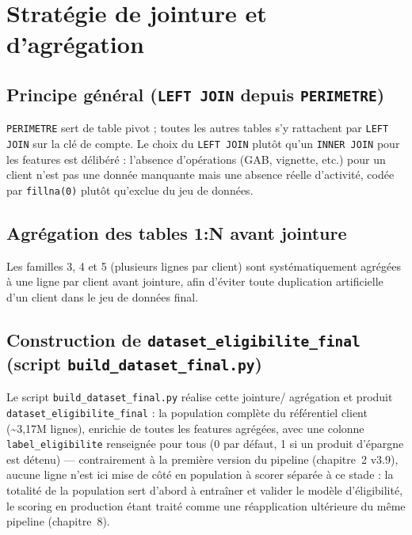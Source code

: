 \documentclass[11pt,a4paper]{report}
\begin{document}

\section{Stratégie de jointure et d'agrégation}

\subsection{Principe général (\texttt{LEFT JOIN} depuis \texttt{PERIMETRE})}
\texttt{PERIMETRE} sert de table pivot ; toutes les autres tables s'y
rattachent par \texttt{LEFT JOIN} sur la clé de compte. Le choix du
\texttt{LEFT JOIN} plutôt qu'un \texttt{INNER JOIN} pour les features est
délibéré : l'absence d'opérations (GAB, vignette, etc.) pour un client
n'est pas une donnée manquante mais une absence réelle d'activité, codée
par \texttt{fillna(0)} plutôt qu'exclue du jeu de données.

\subsection{Agrégation des tables 1:N avant jointure}
Les familles 3, 4 et 5 (plusieurs lignes par client) sont systématiquement
agrégées à une ligne par client avant jointure, afin d'éviter toute
duplication artificielle d'un client dans le jeu de données final.

\subsection{Construction de \texttt{dataset\_eligibilite\_final} (script \texttt{build\_dataset\_final.py})}
Le script \texttt{build\_dataset\_final.py} réalise cette jointure/
agrégation et produit \texttt{dataset\_eligibilite\_final} : la population
complète du référentiel client (\textasciitilde 3,17M lignes), enrichie de
toutes les features agrégées, avec une colonne \texttt{label\_eligibilite}
renseignée pour tous (0 par défaut, 1 si un produit d'épargne est détenu)
— contrairement à la première version du pipeline (chapitre~2 v3.9),
aucune ligne n'est ici mise de côté en \og population à scorer \fg{}
séparée à ce stade : la totalité de la population sert d'abord à entraîner
et valider le modèle d'éligibilité, le \og scoring en production \fg{}
étant traité comme une réapplication ultérieure du même pipeline
(chapitre~8).
\end{document}
